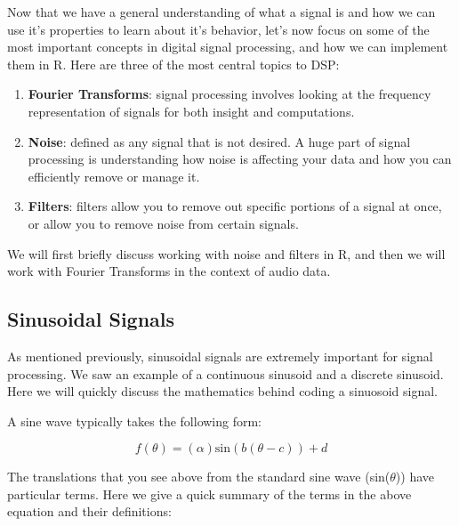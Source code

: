 \documentclass[]{krantz}
\providecommand{\tightlist}{%
  \setlength{\itemsep}{0pt}\setlength{\parskip}{0pt}}
\begin{document}
Now that we have a general understanding of what a signal is and how we can use it's properties to learn about it's behavior, let's now focus on some of the most important concepts in digital signal processing, and how we can implement them in R. Here are three of the most central topics to DSP:

\begin{enumerate}
\def\labelenumi{\arabic{enumi}.}
\tightlist
\item
  \textbf{Fourier Transforms}: signal processing involves looking at the frequency representation of signals for both insight and computations.
\item
  \textbf{Noise}: defined as any signal that is not desired. A huge part of signal processing is understanding how noise is affecting your data and how you can efficiently remove or manage it.
\item
  \textbf{Filters}: filters allow you to remove out specific portions of a signal at once, or allow you to remove noise from certain signals.
\end{enumerate}

We will first briefly discuss working with noise and filters in R, and then we will work with Fourier Transforms in the context of audio data.

\hypertarget{sinusoidal-signals}{%
\subsection{Sinusoidal Signals}\label{sinusoidal-signals}}

As mentioned previously, sinusoidal signals are extremely important for signal processing. We saw an example of a continuous sinusoid and a discrete sinusoid. Here we will quickly discuss the mathematics behind coding a sinuosoid signal.

A sine wave typically takes the following form:

\[
f(\theta) = (\alpha) \text{sin}(b(\theta - c)) + d
\]

The translations that you see above from the standard sine wave (sin(\(\theta\))) have particular terms. Here we give a quick summary of the terms in the above equation and their definitions:
\end{document}
